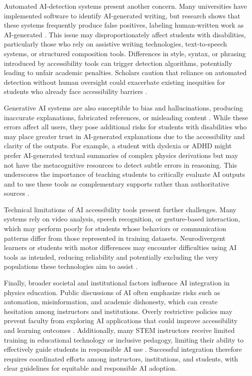 \documentclass[]{aastex701}
\begin{document}
Automated AI-detection systems present another concern. Many universities have implemented software to identify AI-generated writing, but research shows that these systems frequently produce false positives, labeling human-written work as AI-generated \citep{Voultsiou2025, HarkinsBrown2025}. This issue may disproportionately affect students with disabilities, particularly those who rely on assistive writing technologies, text-to-speech systems, or structured composition tools. Differences in style, syntax, or phrasing introduced by accessibility tools can trigger detection algorithms, potentially leading to unfair academic penalties. Scholars caution that reliance on automated detection without human oversight could exacerbate existing inequities for students who already face accessibility barriers \citep{Voultsiou2025, HarkinsBrown2025}.

Generative AI systems are also susceptible to bias and hallucinations, producing inaccurate explanations, fabricated references, or misleading content \citep{Paglialunga2025, Voultsiou2025, Weijers2025}. While these errors affect all users, they pose additional risks for students with disabilities who may place greater trust in AI-generated explanations due to the accessibility and clarity of the outputs. For example, a student with dyslexia or ADHD might prefer AI-generated textual summaries of complex physics derivations but may not have the metacognitive resources to detect subtle errors in reasoning. This underscores the importance of teaching students to critically evaluate AI outputs and to use these tools as complementary supports rather than authoritative sources \citep{Paglialunga2025, Voultsiou2025, Weijers2025}.

Technical limitations of AI accessibility tools present further challenges. Many systems rely on video analysis, speech recognition, or gesture-based interaction, which may perform poorly for students whose behaviors or communication patterns differ from those represented in training datasets. Neurodivergent learners or students with motor differences may encounter difficulties using AI tools as intended, reducing reliability and potentially excluding the very populations these technologies aim to assist \citep{Voultsiou2025, HarkinsBrown2025}.

Finally, broader societal and institutional factors influence AI integration in physics education. Public discussions of AI often emphasize risks such as automation, misinformation, and academic dishonesty, which can create hesitation among instructors and institutions. Overly restrictive policies may prevent faculty from exploring AI applications that could improve accessibility and learning outcomes \citep{Liang2026}. Additionally, many STEM instructors receive limited training in educational technology or inclusive pedagogy, limiting their ability to effectively guide students in responsible AI use \citep{Almufareh2025, Voultsiou2025}. Successful integration therefore requires coordinated efforts among instructors, institutions, and students, with clear guidelines for equitable and responsible AI adoption.
\end{document}
